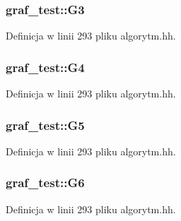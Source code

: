 \hypertarget{classgraf__test_aaa19fc1426adf89a109e8679b92ee076}{
\subsubsection[{G3}]{ graf\-\_\-test\-::\-G3\hspace{0.3cm}{\ttfamily [private]}}}\label{classgraf__test_aaa19fc1426adf89a109e8679b92ee076}


Definicja w linii 293 pliku algorytm.\-hh.

\hypertarget{classgraf__test_acdda3ab9733fc4d62802fdf2f3872da5}{
\subsubsection[{G4}]{ graf\-\_\-test\-::\-G4\hspace{0.3cm}{\ttfamily [private]}}}\label{classgraf__test_acdda3ab9733fc4d62802fdf2f3872da5}


Definicja w linii 293 pliku algorytm.\-hh.

\hypertarget{classgraf__test_a1ed75824208bf907bf0c80de05046b49}{
\subsubsection[{G5}]{ graf\-\_\-test\-::\-G5\hspace{0.3cm}{\ttfamily [private]}}}\label{classgraf__test_a1ed75824208bf907bf0c80de05046b49}


Definicja w linii 293 pliku algorytm.\-hh.

\hypertarget{classgraf__test_a01b58fa6f7b1a36c0239e65d9c6b87a0}{
\subsubsection[{G6}]{ graf\-\_\-test\-::\-G6\hspace{0.3cm}{\ttfamily [private]}}}\label{classgraf__test_a01b58fa6f7b1a36c0239e65d9c6b87a0}


Definicja w linii 293 pliku algorytm.\-hh.

